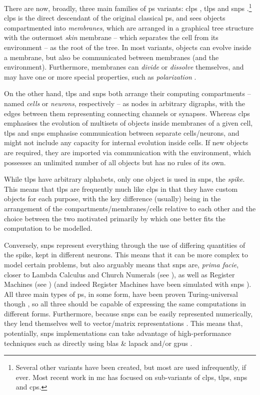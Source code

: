 There are now, broadly, three main families of \gls{ps} variants:  \gls{clps} \cite{Paun2001,Paun2002}, \gls{tlps} \cite{tMaPaPaRo01a,Martin-Vide2003} and \gls{snps} \cite{Ionescu2006}.\footnote{Several other variants have been created, but most are used infrequently, if ever.  Most recent work in \gls{mc} has focused on sub-variants of \gls{clps}, \gls{tlps}, \gls{snps} and \gls{cps}.}  \Gls{clps} is the direct descendant of the original classical \gls{ps}, and sees objects compartmented into \emph{membranes}, which are arranged in a graphical tree structure with the outermost \emph{skin} membrane -- which separates the cell from its environment -- as the root of the tree.  In most variants, objects can evolve inside a membrane, but also be communicated between membranes (and the environment).  Furthermore, membranes can \emph{divide} or \emph{dissolve} themselves, and may have one or more special properties, such as \emph{polarization} \cite{Paun1999a}.

On the other hand, \gls{tlps} and \gls{snps} both arrange their computing \glspl{compartment} -- named \emph{cells} or \emph{neurons}, respectively -- as nodes in arbitrary digraphs, with the edges between them representing connecting channels or synapses.  Whereas \gls{clps} emphasises the evolution of multisets of objects inside membranes of a given cell, \gls{tlps} and \gls{snps} emphasise communication between separate cells/neurons, and might not include any capacity for internal evolution inside cells.  If new objects are required, they are imported via communication with the environment, which possesses an unlimited number of all objects but has no rules of its own.

While \gls{tlps} have arbitrary alphabets, only one object is used in \gls{snps}, the \emph{spike}.  This means that \gls{tlps} are frequently much like \gls{clps} in that they have custom objects for each purpose, with the key difference (usually) being in the arrangement of the \glspl{compartment}/membranes/cells relative to each other and the choice between the two motivated primarily by which one better fits the computation to be modelled.

Conversely, \gls{snps} represent everything through the use of differing quantities of the spike, kept in different neurons.  This means that it can be more complex to model certain problems, but also arguably means that \gls{snps} are, \textit{prima facie}, closer to Lambda Calculus \cite{Barendregt1984} and Church Numerals (see \eg{} \cite{Koopman2014,Hinze2005}), as well as Register Machines (see \eg{} \cite{Korec1996}) (and indeed Register Machines have been simulated with \gls{snps} \cite{Pan2010}).  All three main types of \gls{ps}, in some form, have been proven Turing-universal though \cite{Bernardini2005,Chen2008,Freund2005}, so all three should be capable of expressing the same computations in different forms.  Furthermore, because \gls{snps} can be easily represented numerically, they lend themselves well to vector/matrix representations \cite{Zeng2010,Martinez-del-Amor2021,Gheorghe2021,Hu2016}.  This means that, potentially, \gls{snps} implementations can take advantage of high-performance techniques such as directly using \gls{blas} \& \gls{lapack} and/or \glspl{gpu} \cite{Aboy2019}.

